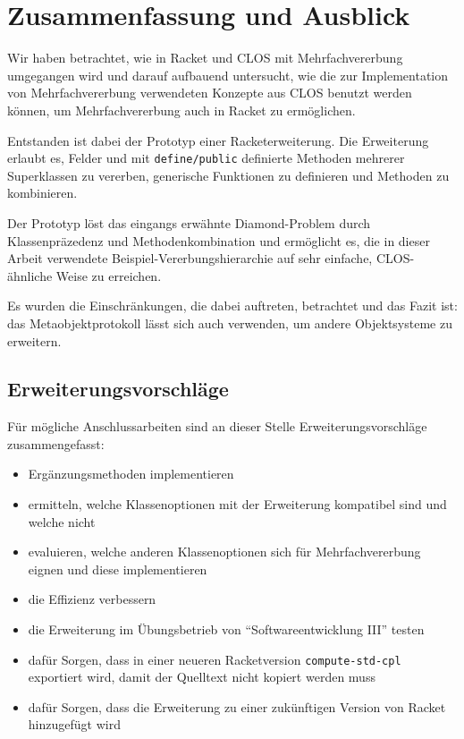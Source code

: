 \chapter{Zusammenfassung und Ausblick}
Wir haben betrachtet, wie in Racket und CLOS mit Mehrfachvererbung umgegangen wird und darauf aufbauend untersucht, wie die zur Implementation von Mehrfachvererbung verwendeten Konzepte aus CLOS benutzt werden können, um Mehrfachvererbung auch in Racket zu ermöglichen.

Entstanden ist dabei der Prototyp einer Racketerweiterung. Die Erweiterung erlaubt es, Felder und mit \texttt{define/public} definierte Methoden mehrerer Superklassen zu vererben, generische Funktionen zu definieren und Methoden zu kombinieren.

Der Prototyp löst das eingangs erwähnte Diamond-Problem durch Klassenpräzedenz und Methodenkombination und ermöglicht es, die in dieser Arbeit verwendete Beispiel-Vererbungshierarchie auf sehr einfache, CLOS-ähnliche Weise zu erreichen.

Es wurden die Einschränkungen, die dabei auftreten, betrachtet und das Fazit ist: das Metaobjektprotokoll lässt sich auch verwenden, um andere Objektsysteme zu erweitern.

\section{Erweiterungsvorschläge}

Für mögliche Anschlussarbeiten sind an dieser Stelle Erweiterungsvorschläge zusammengefasst:
\begin{itemize}
 \item Ergänzungsmethoden implementieren
 \item ermitteln, welche Klassenoptionen mit der Erweiterung kompatibel sind und welche nicht
 \item evaluieren, welche anderen Klassenoptionen sich für Mehrfachvererbung eignen und diese implementieren
 \item die Effizienz verbessern
 \item die Erweiterung im Übungsbetrieb von ``Softwareentwicklung III'' testen
 \item dafür Sorgen, dass in einer neueren Racketversion \texttt{compute-std-cpl} exportiert wird, damit der Quelltext nicht kopiert werden muss
 \item dafür Sorgen, dass die Erweiterung zu einer zukünftigen Version von Racket hinzugefügt wird 
\end{itemize}